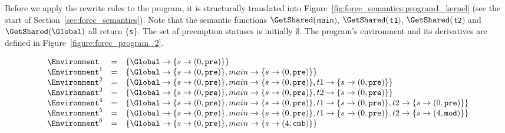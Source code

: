 Before we apply the rewrite rules to the program, 
it is structurally translated into 
Figure~\ref{fig:forec_semantics:program1_kernel} 
(see the start of Section~\ref{sec:forec_semantics}).
Note that the semantic functions $\GetShared($\verb$main$$)$, 
$\GetShared($\verb$t1$$)$, $\GetShared($\verb$t2$$)$ 
and $\GetShared(\Global)$ all return $\lbrace$\verb$s$$\rbrace$.
The set of preemption statuses \Abort{} is initially $\emptyset$.
The program's environment \Environment{} and its derivatives 
are defined in Figure~\ref{figure:forec_program_2}.
\newline

\begin{figure}
	\centering
	$$\begin{array}{l l l}
		\Environment		&=& \left \lbrace
									\Global \to \lbrace s \to (0, \texttt{pre}) \rbrace
								\right \rbrace		\\
		\Environment^1		&=& \left \lbrace
									\Global \to \lbrace s \to (0, \texttt{pre}) \rbrace,
									main \to \lbrace s \to (0, \texttt{pre}) \rbrace
								\right \rbrace		\\
		\Environment^2		&=& \left \lbrace
									\Global \to \lbrace s \to (0, \texttt{pre}) \rbrace,
									main \to \lbrace s \to (0, \texttt{pre}) \rbrace,
									t1 \to \lbrace s \to (0, \texttt{pre}) \rbrace
								\right \rbrace		\\
		\Environment^3		&=& \left \lbrace
									\Global \to \lbrace s \to (0, \texttt{pre}) \rbrace,
									main \to \lbrace s \to (0, \texttt{pre}) \rbrace,
									t2 \to \lbrace s \to (0, \texttt{pre}) \rbrace
								\right \rbrace		\\
		\Environment^4		&=& \left \lbrace
									\Global \to \lbrace s \to (0, \texttt{pre}) \rbrace,
									main \to \lbrace s \to (0, \texttt{pre}) \rbrace,
									t1 \to \lbrace s \to (0, \texttt{pre}) \rbrace,
									t2 \to \lbrace s \to (0, \texttt{pre}) \rbrace
								\right \rbrace		\\
		\Environment^5		&=& \left \lbrace
									\Global \to \lbrace s \to (0, \texttt{pre}) \rbrace,
									main \to \lbrace s \to (0, \texttt{pre}) \rbrace,
									t1 \to \lbrace s \to (0, \texttt{pre}) \rbrace,
									t2 \to \lbrace s \to (4, \texttt{mod}) \rbrace
								\right \rbrace		\\
		\Environment^6		&=& \left \lbrace
									\Global \to \lbrace s \to (0, \texttt{pre}) \rbrace,
									main \to \lbrace s \to (4, \texttt{cmb}) \rbrace
								\right \rbrace		\\

\end{array}$$
\end{figure}
